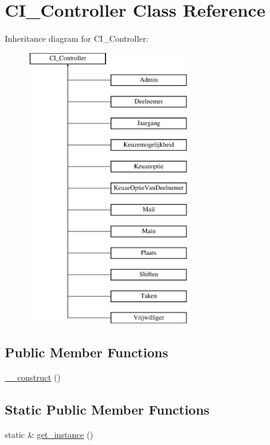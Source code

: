 \hypertarget{class_c_i___controller}{}\section{C\+I\+\_\+\+Controller Class Reference}
\label{class_c_i___controller}
Inheritance diagram for C\+I\+\_\+\+Controller\+:\begin{figure}[H]
\begin{center}
\leavevmode
\includegraphics[height=12.000000cm]{class_c_i___controller}
\end{center}
\end{figure}
\subsection*{Public Member Functions}
\begin{DoxyCompactItemize}
\item 
\mbox{\hyperlink{class_c_i___controller_a095c5d389db211932136b53f25f39685}{\+\_\+\+\_\+construct}} ()
\end{DoxyCompactItemize}
\subsection*{Static Public Member Functions}
\begin{DoxyCompactItemize}
\item 
static \& \mbox{\hyperlink{class_c_i___controller_a8d3cc57e7b6ec94e704712b0f277f5bb}{get\+\_\+instance}} ()
\end{DoxyCompactItemize}


